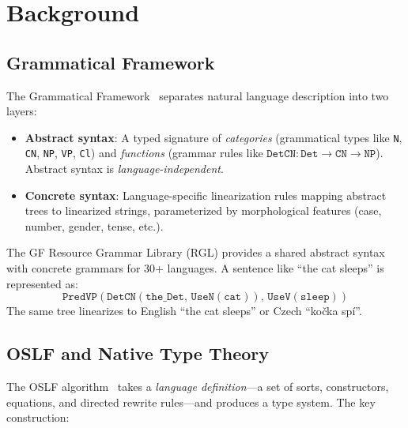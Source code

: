 \documentclass[11pt]{article}
\newcommand{\code}[1]{\texttt{#1}}
\newcommand{\OSLF}{\textup{OSLF}}
\newcommand{\GF}{\textup{GF}}
\newcommand{\RGL}{\textup{RGL}}
\begin{document}
\section{Background}
\label{sec:background}

\subsection{Grammatical Framework}

The Grammatical Framework~\cite{Ranta2004,Ranta2011} separates natural
language description into two layers:

\begin{itemize}
\item \textbf{Abstract syntax}: A typed signature of \emph{categories}
  (grammatical types like \code{N}, \code{CN}, \code{NP}, \code{VP},
  \code{Cl}) and \emph{functions} (grammar rules like
  $\code{DetCN} : \code{Det} \to \code{CN} \to \code{NP}$).  Abstract
  syntax is \emph{language-independent}.
\item \textbf{Concrete syntax}: Language-specific linearization rules mapping
  abstract trees to linearized strings, parameterized by morphological features
  (case, number, gender, tense, etc.).
\end{itemize}

The \GF{} Resource Grammar Library (\RGL{}) provides a shared abstract syntax
with concrete grammars for 30+ languages.  A sentence like ``the cat sleeps''
is represented as:
\[
  \code{PredVP}(\code{DetCN}(\code{the\_Det},\, \code{UseN}(\code{cat})),\,
  \code{UseV}(\code{sleep}))
\]
The same tree linearizes to English ``the cat sleeps'' or Czech
``ko\v{c}ka sp\'{i}''.

\subsection{OSLF and Native Type Theory}

The \OSLF{} algorithm~\cite{MeredithStayOSLF2020} takes a \emph{language
definition}---a set of sorts, constructors, equations, and directed rewrite
rules---and produces a type system.  The key construction:
\end{document}
